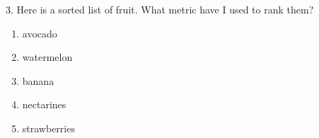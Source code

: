 \Large 3. Here is a sorted list of fruit. What metric have I used to rank them?
\begin{enumerate}
   \item avocado 
   \item watermelon 
   \item banana 
   \item nectarines 
   \item strawberries 
\end{enumerate}
